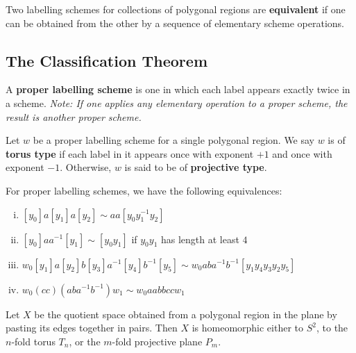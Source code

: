 \begin{definition}
Two labelling schemes for collections of polygonal regions are \textbf{equivalent} if one can be obtained from the other by a sequence of elementary scheme operations.
\end{definition}

\subsection{The Classification Theorem}

\begin{definition}
A \textbf{proper labelling scheme} is one in which each label appears exactly twice in a scheme. 
\textit{Note: If one applies any elementary operation to a proper scheme, the result is another proper scheme.}
\end{definition}

\begin{definition}
Let $w$ be a proper labelling scheme for a single polygonal region. We say $w$ is of \textbf{torus type} if each label in it appears once with exponent $+1$ and once with exponent $-1$.
Otherwise, $w$ is said to be of \textbf{projective type}.
\end{definition}

\begin{theorem}
For proper labelling schemes, we have the following equivalences:
\begin{enumerate}[i)]
    \item $[y_0]a[y_1]a[y_2] \sim aa[y_0 y_1^{-1} y_2]$
    \item $[y_0]aa^{-1}[y_1] \sim [y_0y_1]$ if $y_0y_1$ has length at least $4$
    \item $w_0[y_1]a[y_2]b[y_3]a^{-1}[y_4]b^{-1}[y_5] \sim w_0aba^{-1}b^{-1}[y_1y_4y_3y_2y_5]$
    \item $w_0(cc)(aba^{-1}b^{-1})w_1 \sim w_0 aabbcc w_1$
\end{enumerate}
\end{theorem}

\begin{theorem}
Let $X$ be the quotient space obtained from a polygonal region in the plane by pasting its edges together in pairs. 
Then $X$ is homeomorphic either to $S^2$, to the $n$-fold torus $T_n$, or the $m$-fold projective plane $P_m$.
\end{theorem}

